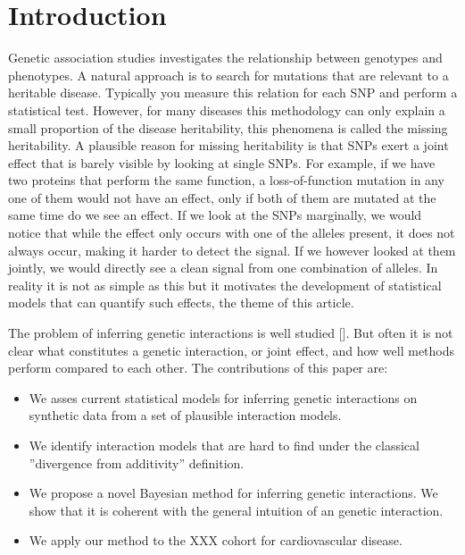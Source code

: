 \documentclass{bioinfo}
\begin{document}

\section{Introduction}
Genetic association studies investigates the relationship between genotypes and phenotypes. A natural approach is to search for mutations that are relevant to a heritable disease. Typically you measure this relation for each SNP and perform a statistical test. However, for many diseases this methodology can only explain a small proportion of the disease heritability, this phenomena is called the missing heritability. A plausible reason for missing heritability is that SNPs exert a joint effect that is barely visible by looking at single SNPs. For example, if we have two proteins that perform the same function, a loss-of-function mutation in any one of them would not have an effect, only if both of them are mutated at the same time do we see an effect. If we look at the SNPs marginally, we would notice that while the effect only occurs with one of the alleles present, it does not always occur, making it harder to detect the signal. If we however looked at them jointly, we would directly see a clean signal from one combination of alleles. In reality it is not as simple as this but it motivates the development of statistical models that can quantify such effects, the theme of this article.

The problem of inferring genetic interactions is well studied []. But often it is not clear what constitutes a genetic interaction, or joint effect, and how well methods perform compared to each other. The contributions of this paper are:
\begin{itemize}
\item We asses current statistical models for inferring genetic interactions on synthetic data from a set of plausible interaction models.
\item We identify interaction models that are hard to find under the classical ''divergence from additivity'' definition.
\item We propose a novel Bayesian method for inferring genetic interactions. We show that it is coherent with the general intuition of an genetic interaction.
\item We apply our method to the XXX cohort for cardiovascular disease.
\end{itemize}
\end{document}
